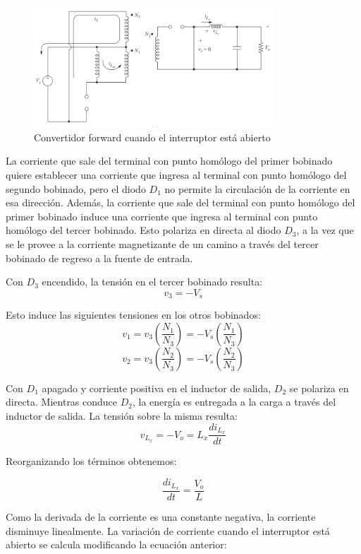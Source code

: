 \begin{figure}[ht]
    \centering
    \includegraphics[width=0.8\textwidth]{../images/hart/forward_switch_open.png}
    \caption{Convertidor forward cuando el interruptor está abierto}
    \label{fig:forward_switch_open}
\end{figure}

La corriente que sale del terminal con punto homólogo del primer bobinado quiere establecer una corriente que ingresa al terminal 
con punto homólogo del segundo bobinado, pero el diodo $D_1$ no permite la circulación de la corriente en esa dirección. 
Además, la corriente que sale del terminal con punto homólogo del primer bobinado induce una corriente que ingresa al terminal 
con punto homólogo del tercer bobinado. Esto polariza en directa al diodo $D_3$, a la vez que 
se le provee a la corriente magnetizante de un camino a través del tercer bobinado de regreso a la fuente de entrada. 

Con $D_3$ encendido, la tensión en el tercer bobinado resulta:
$$ v_3=-V_s $$

Esto induce las siguientes tensiones en los otros bobinados:
$$ v_1=v_3\left(\frac{N_1}{N_3}\right)=-V_s\left(\frac{N_1}{N_3}\right) $$
$$ v_2=v_3\left(\frac{N_2}{N_3}\right)=-V_s\left(\frac{N_2}{N_3}\right) $$

Con $D_1$ apagado y corriente positiva en el inductor de salida, $D_2$ se polariza en directa. 
Mientras conduce $D_2$, la energía es entregada a la carga a través del inductor de salida. 
La tensión sobre la misma resulta:
$$ v_{L_x}=-V_o=L_x\frac{di_{L_x}}{dt} $$

Reorganizando los términos obtenemos:

$$ \frac{di_{L_x}}{dt}=\frac{V_o}{L} $$

Como la derivada de la corriente es una constante negativa, la corriente disminuye linealmente. 
La variación de corriente cuando el interruptor está abierto se calcula modificando la ecuación anterior:

